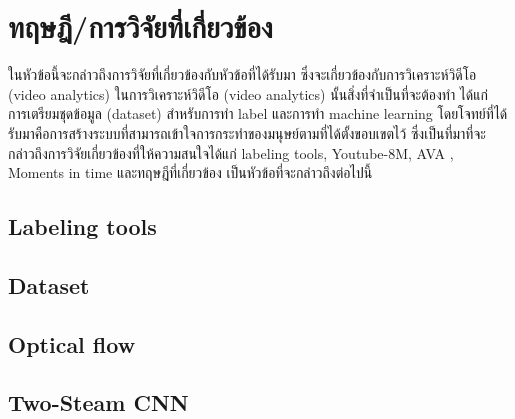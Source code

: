 \clearpage
\chapter{ทฤษฎี/การวิจัยที่เกี่ยวข้อง}
ในหัวข้อนี้จะกล่าวถึงการวิจัยที่เกี่ยวข้องกับหัวข้อที่ได้รับมา ซึ่งจะเกี่ยวข้องกับการวิเคราะห์วิดีโอ (video analytics) ในการวิเคราะห์วิดีโอ (video analytics) นั้นสิ่งที่จำเป็นที่จะต้องทำ ได้แก่ การเตรียมชุดข้อมูล (dataset) สำหรับการทำ label และการทำ machine learning โดยโจทย์ที่ได้รับมาคือการสร้างระบบที่สามารถเข้าใจการกระทำของมนุษย์ตามที่ได้ตั้งขอบเขตไว้ ซึ่งเป็นที่มาที่จะกล่าวถึงการวิจัยเกี่ยวข้องที่ให้ความสนใจได้แก่ labeling tools, Youtube-8M, AVA , Moments in time และทฤษฎีที่เกี่ยวข้อง เป็นหัวข้อที่จะกล่าวถึงต่อไปนี้


\section{Labeling tools}


\clearpage
\section{Dataset}

\clearpage

\clearpage


\section{Optical flow}


\clearpage
\section{Two-Steam CNN}


